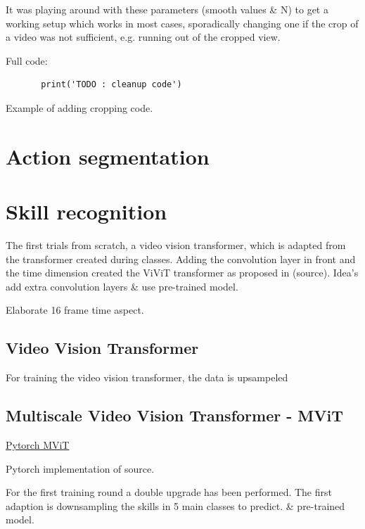 It was playing around with these parameters (smooth values \& N) to get a working setup which works in most cases, sporadically changing one if the crop of a video was not sufficient, e.g. running out of the cropped view.

Full code:

\begin{listing}
   \begin{verbatim}
       print('TODO : cleanup code')
   \end{verbatim}
   \caption[Example codefragment]{Example of adding cropping code.}
\end{listing}


\section{Action segmentation}

\section{Skill recognition}

The first trials from scratch, a video vision transformer, which is adapted from the transformer created during classes. Adding the convolution layer in front and the time dimension created the ViViT transformer as proposed in (source).
Idea's add extra convolution layers \& use pre-trained model.

Elaborate 16 frame time aspect.

\subsection{Video Vision Transformer}

For training the video vision transformer, the data is upsampeled

\subsection{Multiscale Video Vision Transformer - MViT}
\href{https://pytorch.org/vision/main/models/video_mvit.html}{Pytorch MViT}

Pytorch implementation of source.

For the first training round a double upgrade has been performed. The first adaption is downsampling the skills in 5 main classes to predict.  \& pre-trained model.

